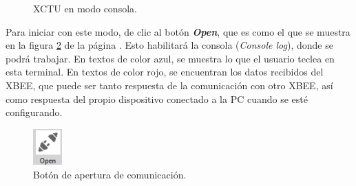 \begin{figure}[H] %
\caption[1]{XCTU en modo consola.}
\label{fig:XTerm}
\end{figure}

Para iniciar con este modo, de clic al botón \textit{\textbf{Open}}, que es como el que se muestra en la figura \ref{fig:OpenC} de la página \pageref{fig:OpenC}. Esto habilitará la consola (\textit{Console log}), donde se podrá trabajar. En textos de color azul, se muestra lo que el usuario teclea en esta terminal. En textos de color rojo, se encuentran los datos recibidos del XBEE, que puede ser tanto respuesta de la comunicación con otro XBEE, así como respuesta del propio dispositivo conectado a la PC cuando se esté configurando.

\begin{figure} %
    \centering
    \includegraphics[width=0.10\textwidth]{Figures/XCTU/OpenButton}
    \caption[1]{Botón de apertura de comunicación.}
    \label{fig:OpenC}
\end{figure}

